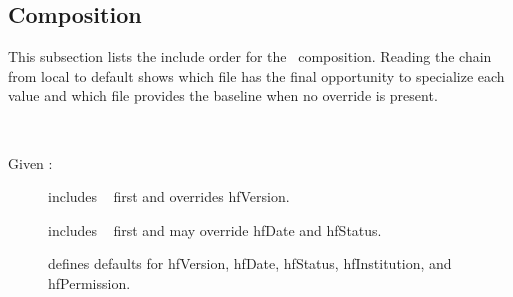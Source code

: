 \documentclass[11pt]{tlc-article}
\begin{document}
\subsection{Composition}
This subsection lists the include order for the \fddd\ composition. Reading the
chain from local to default shows which file has the final opportunity to
specialize each value and which file provides the baseline when no override is
present.

\tlcVspace\

Given \fddd:
\begin{description}
  \item[\fdd] includes \fbd~ first and overrides hfVersion.
  \item[\fbd] includes \fed~ first and may override hfDate and hfStatus.
  \item[\fed] defines defaults for hfVersion, hfDate, hfStatus,
    hfInstitution, and hfPermission.
\end{description}


\printGlossaries%




\end{document}
